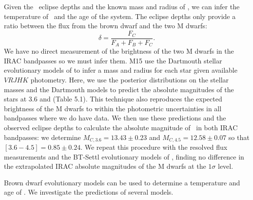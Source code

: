 Given the \spitz\ eclipse depths and the known mass and radius of \LC, 
we can infer the temperature of \LC\ and the age of the system. 
The eclipse depths only provide a ratio between the flux
from the brown dwarf and the two M dwarfs:
\begin{equation}
\delta = \frac{F_C}{F_A + F_B + F_C}.
\end{equation}
We have no direct measurement of the brightness of the two M dwarfs in the
IRAC bandpasses so we must infer them.
M15 use the Dartmouth stellar evolutionary models of \citet{Dotter08}
to infer a mass and radius for each star given available $VRJHK$ photometry.
Here, we use the posterior distributions on the stellar masses and the Dartmouth models to predict
the absolute magnitudes of the stars at 3.6 and \irb (Table 5.1).
This technique also reproduces the expected brightness of the M dwarfs to within the
photometric uncertainties in all bandpasses where we do have data.
We then use these predictions and the observed eclipse depths to 
calculate the absolute magnitude of \LC\ in 
both IRAC bandpasses: we determine $M_{C, 3.6} = 13.43 \pm 0.23$ and 
$M_{C, 4.5} = 12.58 \pm 0.07$ so that $[3.6 - 4.5] = 0.85 \pm 0.24$.
We repeat this procedure with the resolved flux measurements and the BT-Settl
evolutionary models of \citet{Allard12}, finding no difference in the 
extrapolated IRAC absolute magnitudes of the M dwarfs at the $1\sigma$ level.


Brown dwarf evolutionary models can be used to determine a temperature
and age of \LC.
We investigate the predictions of several models.



